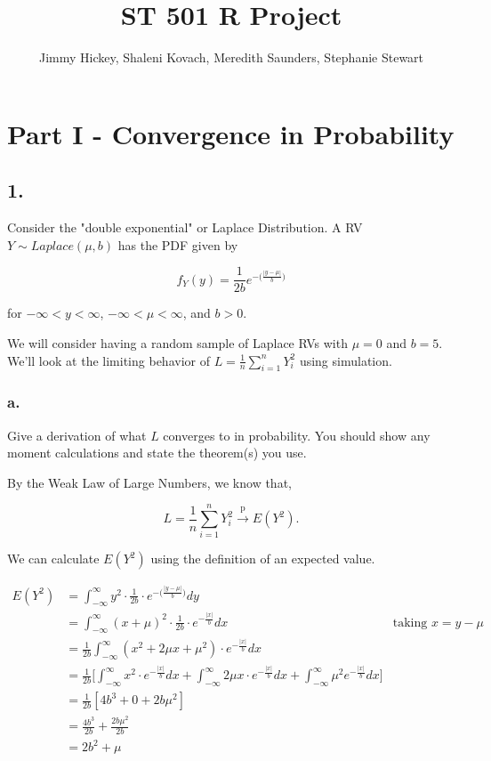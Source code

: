 \documentclass[12pt]{article}
\title{ST 501 R Project}
\author{Jimmy Hickey, Shaleni Kovach, Meredith Saunders, Stephanie Stewart}
\begin{document}
\maketitle
\tableofcontents
\clearpage

\doublespacing

\section{Part I - Convergence in Probability}

\subsection{1.}
Consider the "double exponential" or Laplace Distribution. A RV $Y \sim Laplace(\mu, b)$ has the PDF given by

$$f_Y(y) = \frac{1}{2b}e^{-\Big(  \frac{|y-\mu |}{b}   \Big) } $$

for $-\infty < y < \infty$, $-\infty < \mu < \infty$, and $b>0.$

We will consider having a random sample of Laplace RVs with $\mu = 0$ and $b = 5$. We'll look at the limiting behavior of $L=\frac{1}{n}\sum_{i=1}^{n}Y_i^2$ using simulation.

\subsubsection{a.}
Give a derivation of what $L$ converges to in probability. You should show any moment calculations and state the theorem(s) you use.

\bigskip
\noindent
By the Weak Law of Large Numbers, we know that,

$$L = \frac{1}{n}\sum_{i=1}^{n}Y_i^2 \xrightarrow{\text{p}} E(Y^2).$$

We can calculate  $E(Y^2)$ using the definition of an expected value.

\begin{align*}
	 E(Y^2) & = \int_{-\infty}^{\infty} y^2 \cdot \frac{1}{2b} \cdot e^{-\Big(  \frac{|y-\mu |}{b} \Big)} dy\\
	 & =  \int_{-\infty}^{\infty} (x + \mu)^2 \cdot \frac{1}{2b} \cdot e^{-  \frac{|x|}{b}} dx & \text{taking } x = y - \mu\\
	 & = \frac{ 1 }{2b } \int_{-\infty}^{\infty} (x^2 + 2 \mu x  + \mu^2) \cdot e^{-  \frac{|x|}{b}}dx\\
	 & = \frac{ 1 }{2b } \Big[ \int_{-\infty}^{\infty} x^2 \cdot e^{-  \frac{|x|}{b}}dx+ \int_{-\infty}^{\infty} 2\mu x \cdot e^{-  \frac{|x|}{b}}dx+ \int_{-\infty}^{\infty} \mu^2 e^{-  \frac{|x|}{b}}dx \Big]\\
	 & = \frac{ 1 }{ 2b }[4b^3 + 0 + 2b\mu^2]\\
	 & = \frac{ 4b^3 }{ 2b } + \frac{ 2b\mu^2 }{ 2b }\\
	 & = 2b^2 + \mu
\end{align*}
\end{document}
